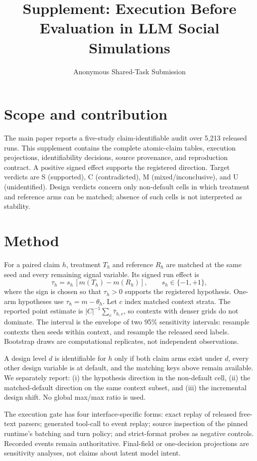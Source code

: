 \documentclass[10pt]{article}
\title{\vspace{-1.2em}Supplement: Execution Before Evaluation in LLM Social Simulations}
\author{Anonymous Shared-Task Submission}
\date{}
\begin{document}
\maketitle
\vspace{-1.7em}

\section{Scope and contribution}
The main paper reports a five-study claim-identifiable audit over 5,213 released runs. This supplement contains the complete atomic-claim tables, execution projections, identifiability decisions, source provenance, and reproduction contract. A positive signed effect supports the registered direction. Target verdicts are S (supported), C (contradicted), M (mixed/inconclusive), and U (unidentified). Design verdicts concern only non-default cells in which treatment and reference arms can be matched; absence of such cells is not interpreted as stability.

\section{Method}
For a paired claim $h$, treatment $T_h$ and reference $R_h$ are matched at the same seed and every remaining signal variable. Its signed run effect is
\[
\tau_h = s_h\,[m(T_h)-m(R_h)], \qquad s_h\in\{-1,+1\},
\]
where the sign is chosen so that $\tau_h>0$ supports the registered hypothesis. One-arm hypotheses use $\tau_h=m-\theta_h$. Let $c$ index matched context strata. The reported point estimate is $|C|^{-1}\sum_c \bar\tau_{h,c}$, so contexts with denser grids do not dominate. The interval is the envelope of two 95\% sensitivity intervals: resample contexts then seeds within context, and resample the released seed labels. Bootstrap draws are computational replicates, not independent observations.

A design level $d$ is identifiable for $h$ only if both claim arms exist under $d$, every other design variable is at default, and the matching keys above remain available. We separately report: (i) the hypothesis direction in the non-default cell, (ii) the matched-default direction on the same context subset, and (iii) the incremental design shift. No global max/max ratio is used.

The execution gate has four interface-specific forms: exact replay of released free-text parsers; generated tool-call to event replay; source inspection of the pinned runtime's batching and turn policy; and strict-format probes as negative controls. Recorded events remain authoritative. Final-field or one-decision projections are sensitivity analyses, not claims about latent model intent.
\end{document}
